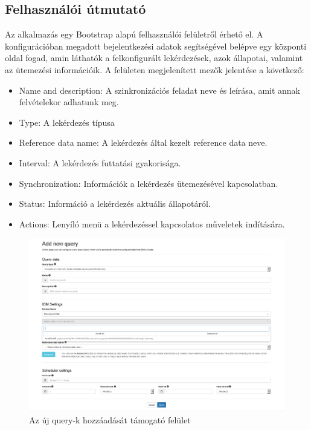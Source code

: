 \subsection{Felhasználói útmutató}

Az alkalmazás egy Bootstrap alapú felhasználói felületről érhető el. A konfigurációban megadott bejelentkezési adatok segítségével belépve egy központi oldal fogad, amin láthatók a felkonfigurált lekérdezések, azok állapotai, valamint az ütemezési információik. A felületen megjelenített mezők jelentése a következő:



\begin{itemize}
	\item Name and description: A szinkronizációs feladat neve és leírása, amit annak felvételekor adhatunk meg.
	\item Type: A lekérdezés típusa
	\item Reference data name: A lekérdezés által kezelt reference data neve.
	\item Interval: A lekérdezés futtatási gyakorisága.
	\item Synchronization: Információk a lekérdezés ütemezésével kapcsolatban.
	\item Status: Információ a lekérdezés aktuális állapotáról.
	\item Actions: Lenyíló menü a lekérdezéssel kapcsolatos műveletek indítására.
\end{itemize}
\begin{figure}[!h]
	\centering
	\includegraphics[width=0.8\linewidth]{figures/refloader_ui/add_new2}
	\caption{Az új query-k hozzáadását támogató felület}
	\label{fig:addnew}
\end{figure}

